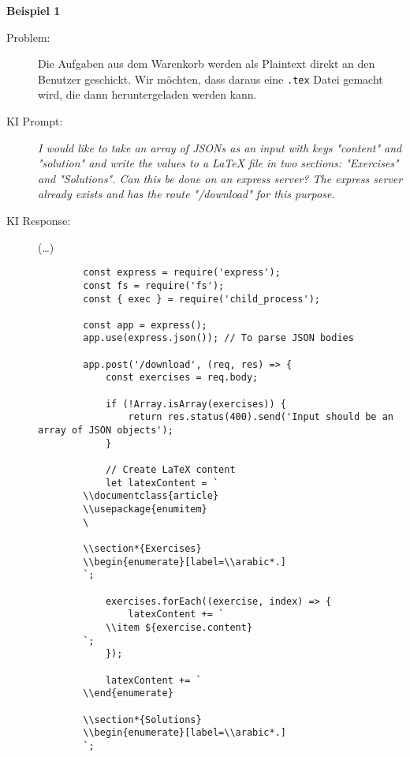 \textbf{Beispiel 1} 
\begin{description}
    \item[Problem:] Die Aufgaben aus dem Warenkorb werden als Plaintext direkt an den Benutzer geschickt. Wir möchten, dass daraus eine \texttt{.tex} Datei gemacht wird, die dann heruntergeladen werden kann.
    \item[KI Prompt:] \emph{I would like to take an array of JSONs as an input with keys "content" and "solution" and write the values to a LaTeX file in two sections: "Exercises" and "Solutions". Can this be done on an express server? The express server already exists and has the route "/download" for this purpose.}
    \item[KI Response:] (\ldots)

    \begin{lstlisting}
        const express = require('express');
        const fs = require('fs');
        const { exec } = require('child_process');
        
        const app = express();
        app.use(express.json()); // To parse JSON bodies
        
        app.post('/download', (req, res) => {
            const exercises = req.body;
        
            if (!Array.isArray(exercises)) {
                return res.status(400).send('Input should be an array of JSON objects');
            }
        
            // Create LaTeX content
            let latexContent = `
        \\documentclass{article}
        \\usepackage{enumitem}
        \
        
        \\section*{Exercises}
        \\begin{enumerate}[label=\\arabic*.]
        `;
        
            exercises.forEach((exercise, index) => {
                latexContent += `
            \\item ${exercise.content}
        `;
            });
        
            latexContent += `
        \\end{enumerate}
        
        \\section*{Solutions}
        \\begin{enumerate}[label=\\arabic*.]
        `;
        

\end{lstlisting}
\end{description}
